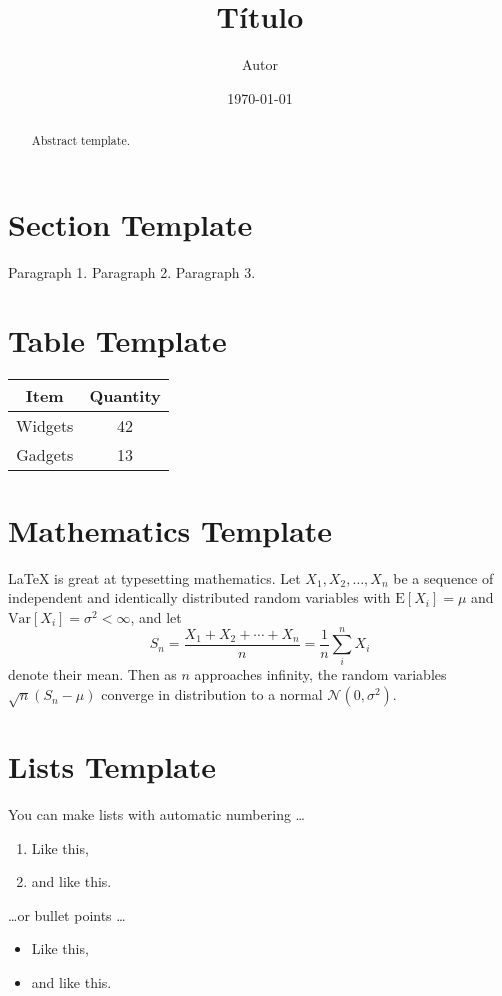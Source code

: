 \documentclass[a4paper,12pt]{article}
\title{Título}
\author{Autor}
\date{\today}  %
\begin{document}
\maketitle
\tableofcontents

\begin{abstract}
Abstract template.
\end{abstract}

\section{Section Template}

Paragraph 1.
Paragraph 2.
Paragraph 3.

\section{Table Template}

\begin{center}
\begin{tabular}{|c|c|}
\hline
Item & Quantity \\
\hline
Widgets & 42 \\
\hline
Gadgets & 13 \\
\hline
\end{tabular}
\end{center}

\section{Mathematics Template}

\LaTeX{} is great at typesetting mathematics. Let $X_1, X_2, \ldots, X_n$ be a sequence of independent and identically distributed random variables with $\text{E}[X_i] = \mu$ and $\text{Var}[X_i] = \sigma^2 < \infty$, and let
$$S_n = \frac{X_1 + X_2 + \cdots + X_n}{n}
      = \frac{1}{n}\sum_{i}^{n} X_i$$
denote their mean. Then as $n$ approaches infinity, the random variables $\sqrt{n}(S_n - \mu)$ converge in distribution to a normal $\mathcal{N}(0, \sigma^2)$.


\section{Lists Template}

You can make lists with automatic numbering \dots

\begin{enumerate}
\item Like this,
\item and like this.
\end{enumerate}
\dots or bullet points \dots
\begin{itemize}
\item Like this,
\item and like this.
\end{itemize}
\end{document}
